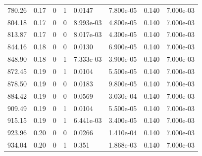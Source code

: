 \documentclass[preview]{standalone}
\begin{document}
{{{\begin{tabular}{L{1.2cm}C{1.2cm} C{0.3cm}C{0.5cm} C{1.4cm}C{1.4cm} C{1.4cm}C{1.4cm}}
  780.26  &  0.17  & 0     &  1 &  0.0147  & 7.800e-05  & 0.140 &  7.000e-03   \\ 
  804.18  &  0.17  & 0     &  0 &  8.993e-03  & 4.800e-05  & 0.140 &  7.000e-03   \\ 
  813.87  &  0.17  & 0     &  0 &  8.017e-03  & 4.300e-05  & 0.140 &  7.000e-03   \\ 
  844.16  &  0.18  & 0     &  0 &  0.0130  & 6.900e-05  & 0.140 &  7.000e-03   \\ 
  848.90  &  0.18  & 0     &  1 &  7.333e-03  & 3.900e-05  & 0.140 &  7.000e-03   \\ 
  872.45  &  0.19  & 0     &  1 &  0.0104  & 5.500e-05  & 0.140 &  7.000e-03   \\ 
  878.50  &  0.19  & 0     &  0 &  0.0183  & 9.800e-05  & 0.140 &  7.000e-03   \\ 
  884.42  &  0.19  & 0     &  0 &  0.0569  & 3.030e-04  & 0.140 &  7.000e-03   \\ 
  909.49  &  0.19  & 0     &  1 &  0.0104  & 5.500e-05  & 0.140 &  7.000e-03   \\ 
  915.15  &  0.19  & 0     &  1 &  6.441e-03  & 3.400e-05  & 0.140 &  7.000e-03   \\ 
  923.96  &  0.20  & 0     &  0 &  0.0266  & 1.410e-04  & 0.140 &  7.000e-03   \\ 
  934.04  &  0.20  & 0     &  1 &  0.351  & 1.868e-03  & 0.140 &  7.000e-03   \\ 
\hline 
\end{tabular} 

}}}
\end{document}
